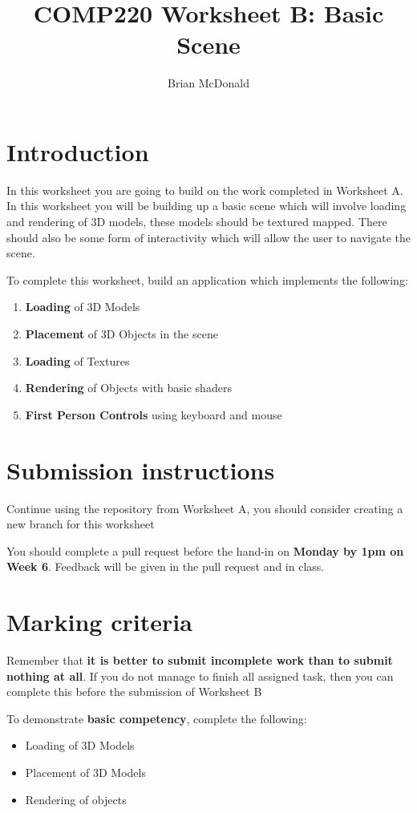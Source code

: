 \documentclass{../../../fal_assignment}
\title{COMP220 Worksheet B: Basic Scene}
\author{Brian McDonald}
\begin{document}
\maketitle

\section*{Introduction}

In this worksheet you are going to build on the work completed in Worksheet A. In this worksheet you will be building up a basic scene which will involve loading and rendering of 3D models, these models should be textured mapped. There should also be some form of interactivity which will allow the user to navigate the scene.

To complete this worksheet, build an application which implements the following:
\begin{enumerate}[label=(\alph*)]
	\item \textbf{Loading} of 3D Models
	\item \textbf{Placement} of 3D Objects in the scene
	\item \textbf{Loading} of Textures
	\item \textbf{Rendering} of Objects with basic shaders
	\item \textbf{First Person Controls} using keyboard and mouse
\end{enumerate}

\section*{Submission instructions}

Continue using the repository from Worksheet A, you should consider creating a new branch for this worksheet

You should complete a pull request before the hand-in on \textbf{Monday by 1pm on Week 6}. Feedback will be given in the pull request and in class.

\section*{Marking criteria}

Remember that \textbf{it is better to submit incomplete work than to submit nothing at all}. If you do not manage to finish all assigned task, then you can complete this before the submission of Worksheet B

To demonstrate \textbf{basic competency}, complete the following:
\begin{itemize}
	\item Loading of 3D Models
	\item Placement of 3D Models
	\item Rendering of objects
\end{itemize} 
\end{document}
